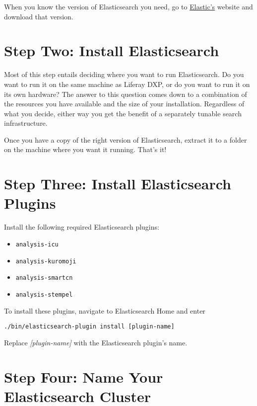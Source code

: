When you know the version of Elasticsearch you need, go to
\href{https://www.elastic.co}{Elastic's} website and download that
version.

\section{Step Two: Install
Elasticsearch}\label{step-two-install-elasticsearch}

Most of this step entails deciding where you want to run Elasticsearch.
Do you want to run it on the same machine as Liferay DXP, or do you want
to run it on its own hardware? The answer to this question comes down to
a combination of the resources you have available and the size of your
installation. Regardless of what you decide, either way you get the
benefit of a separately tunable search infrastructure.

Once you have a copy of the right version of Elasticsearch, extract it
to a folder on the machine where you want it running. That's it!

\section{Step Three: Install Elasticsearch
Plugins}\label{step-three-install-elasticsearch-plugins}

Install the following required Elasticsearch plugins:

\begin{itemize}
\tightlist
\item
  \texttt{analysis-icu}
\item
  \texttt{analysis-kuromoji}
\item
  \texttt{analysis-smartcn}
\item
  \texttt{analysis-stempel}
\end{itemize}

To install these plugins, navigate to Elasticsearch Home and enter

\begin{verbatim}
./bin/elasticsearch-plugin install [plugin-name]
\end{verbatim}

Replace \emph{{[}plugin-name{]}} with the Elasticsearch plugin's name.

\section{Step Four: Name Your Elasticsearch
Cluster}\label{step-four-name-your-elasticsearch-cluster}

